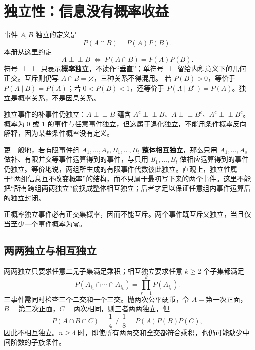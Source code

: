 \documentclass[11pt,a4paper]{ctexart}
\newcommand{\kw}[1]{\textbf{\color{deep}#1}}
\newcommand{\indep}{\mathrel{\perp\!\!\!\perp}}
\begin{document}
\section{独立性：信息没有概率收益}

事件 $A,B$ 独立的定义是
\[
\boxed{P(A\cap B)=P(A)P(B)}.
\]
本册从这里约定
\[
\boxed{A\indep B\;\Longleftrightarrow\;P(A\cap B)=P(A)P(B)}.
\]
符号 $\indep$ 只表示\textbf{概率独立}，不读作“垂直”；单符号 $\perp$ 留给内积意义下的几何正交。互斥则仍写 $A\cap B=\varnothing$，三种关系不得混用。
若 $P(B)>0$，等价于 $P(A\mid B)=P(A)$；若 $0<P(B)<1$，还等价于 $P(A\mid B^c)=P(A)$。独立是概率关系，不是因果关系。

独立事件的补事件仍独立：$A\indep B$ 蕴含 $A^c\indep B$、$A\indep B^c$、$A^c\indep B^c$。概率为 $0$ 或 $1$ 的事件与任意事件独立，但这属于退化独立，不能用条件概率反向解释，因为某些条件概率没有定义。

更一般地，若有限事件组 $A_1,\ldots,A_s,B_1,\ldots,B_t$ \kw{整体相互独立}，那么只用 $A_1,\ldots,A_s$ 做补、有限并交等事件运算得到的事件，与只用 $B_1,\ldots,B_t$ 做相应运算得到的事件仍独立。等价地说，两组所生成的有限事件代数彼此独立。直观上，独立性属于“两组信息互不改变概率”的结构，而不只属于最初写下来的两个事件。这里不能把“所有跨组两两独立”偷换成整体相互独立；后者才足以保证任意组内事件运算后的独立封闭。

正概率独立事件必有正交集概率，因而不能互斥。两个事件既互斥又独立，当且仅当至少一个事件概率为零。

\subsection{两两独立与相互独立}

两两独立只要求任意二元子集满足乘积；相互独立要求任意 $k\ge2$ 个子集都满足
\[
P(A_{i_1}\cap\cdots\cap A_{i_k})=\prod_{r=1}^{k}P(A_{i_r}).
\]
三事件需同时检查三个二交和一个三交。抛两次公平硬币，令 $A=$第一次正面，$B=$第二次正面，$C=$两次相同，则三者两两独立，但
\[
P(A\cap B\cap C)=\frac14\ne\frac18=P(A)P(B)P(C),
\]
因此不相互独立。$n\ge4$ 时，即使所有两两交和全交都符合乘积，也仍可能缺少中间阶数的子族条件。
\end{document}
